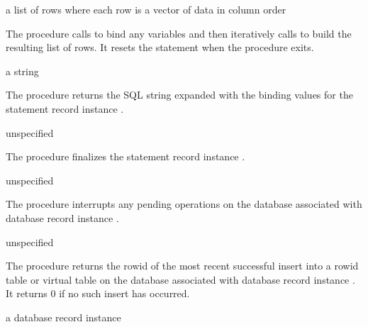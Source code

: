 \begin{procedure}
\end{procedure}
\returns{} a list of rows where each row is a vector of data in column order

The  procedure calls  to bind any variables and then
iteratively calls  to build the
resulting list of rows. It resets the statement when the procedure
exits.

\begin{procedure}
\end{procedure}
\returns{} a string

The  procedure returns the SQL string
expanded with the binding values for the statement record instance
.

\begin{procedure}
\end{procedure}
\returns{} unspecified

The  procedure finalizes the statement record
instance .

\begin{procedure}
\end{procedure}
\returns{} unspecified

The  procedure interrupts any pending
operations on the database associated with database record instance
.

\begin{procedure}
\end{procedure}
\returns{} unspecified

The  procedure returns the rowid of the
most recent successful insert into a rowid table or virtual table on
the database associated with database record instance . It
returns 0 if no such insert has occurred.

\begin{procedure}
\end{procedure}
\returns{} a database record instance

